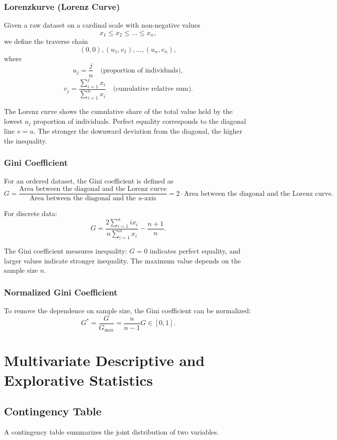 \documentclass{article}
\begin{document}
\subsubsection{Lorenzkurve (Lorenz Curve)}
Given a raw dataset on a cardinal scale with non-negative values
\[
x_1 \leq x_2 \leq \dots \leq x_n,
\]
we define the traverse chain
\[
(0,0),(u_1,v_1),\dots,(u_n,v_n),
\]
where
\[
u_j = \frac{j}{n} \quad \text{(proportion of individuals)},
\]
\[
v_j = \frac{\sum_{i = 1}^{j} x_i}{\sum_{i = 1}^{n} x_i} 
\quad \text{(cumulative relative sum)}.
\]

The Lorenz curve shows the cumulative share of the total value held by the lowest $u_j$ proportion of individuals.
Perfect equality corresponds to the diagonal line $v = u$.
The stronger the downward deviation from the diagonal, the higher the inequality.

\subsubsection{Gini Coefficient}
For an ordered dataset, the Gini coefficient is defined as
\[
G = \frac{\text{Area between the diagonal and the Lorenz curve}}
{\text{Area between the diagonal and the } u\text{-axis}}
= 2 \cdot \text{Area between the diagonal and the Lorenz curve}.
\]

For discrete data:
\[
G = \frac{2\sum_{i = 1}^{n} i x_i}{n \sum_{i = 1}^{n} x_i}
- \frac{n+1}{n}.
\]

The Gini coefficient measures inequality:  
$G = 0$ indicates perfect equality, and larger values indicate stronger inequality.
The maximum value depends on the sample size $n$.

\subsubsection{Normalized Gini Coefficient}
To remove the dependence on sample size, the Gini coefficient can be normalized:
\[
G^* = \frac{G}{G_{\max}} = \frac{n}{n-1} G \in [0,1].
\]

\section{Multivariate Descriptive and Explorative Statistics}

\subsection{Contingency Table}
A contingency table summarizes the joint distribution of two variables.
\end{document}
